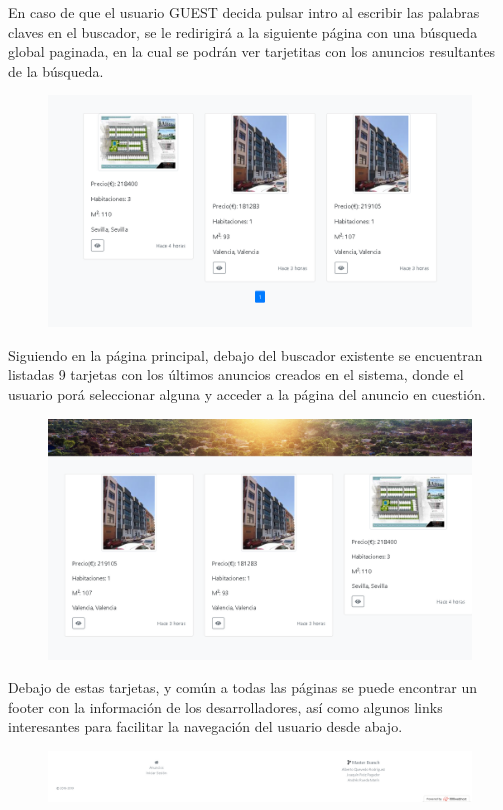 En caso de que el usuario GUEST decida pulsar intro al escribir las palabras claves en el buscador, se le redirigir\'{a} a la siguiente p\'{a}gina con una b\'{u}squeda global paginada, en la cual se podr\'{a}n ver tarjetitas con los anuncios resultantes de la b\'{u}squeda.

\begin{figure}[h!]
\centering
\includegraphics[width=.7\textwidth]{Img/ManualUsuario/GLOBAL_SEARCH_ENTER.png}
\end{figure}

Siguiendo en la p\'{a}gina principal, debajo del buscador existente se encuentran listadas 9 tarjetas con los \'{u}ltimos anuncios creados en el sistema, donde el usuario por\'{a} seleccionar alguna y acceder a la p\'{a}gina del anuncio en cuesti\'{o}n.


\begin{figure}[h!]
\centering
\includegraphics[width=.5\textwidth]{Img/ManualUsuario/TARJETAS.png}
\end{figure}


Debajo de estas tarjetas, y com\'{u}n a todas las p\'{a}ginas se puede encontrar un footer con la informaci\'{o}n de los desarrolladores, as\'{i} como algunos links interesantes para facilitar la navegaci\'{o}n del usuario desde abajo.

\begin{figure}[h!]
\centering
\includegraphics[width=1\textwidth]{Img/ManualUsuario/FOOTER.png}
\end{figure}


